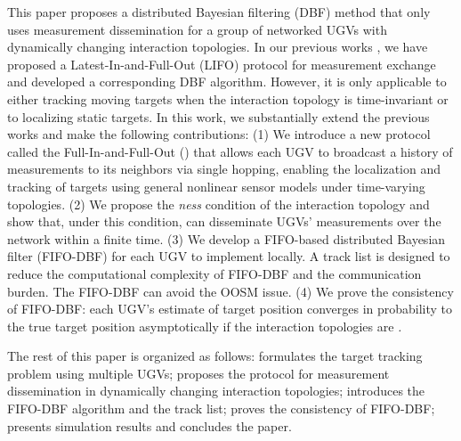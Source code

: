 	\textcolor{\revcol}{
	This paper proposes a distributed Bayesian filtering (DBF) method that only uses measurement dissemination for a group of networked UGVs with dynamically changing interaction topologies. 
	In our previous works \cite{liu2017measurement,liu2016distributed,liu2017distributed}, we have proposed a Latest-In-and-Full-Out (LIFO) protocol for measurement exchange and developed a corresponding DBF algorithm.
	However, it is only applicable to either tracking moving targets when the interaction topology is time-invariant or to localizing static targets.
	In this work, we substantially extend the previous works and make the following contributions:
	(1) We introduce a new protocol called the Full-In-and-Full-Out (\proto) that allows each UGV to broadcast a history of measurements to its neighbors via single hopping, enabling the localization and tracking of targets using general nonlinear sensor models under time-varying topologies. 
	(2) We propose the 
	\textit{{\fc ness}} condition of the interaction topology and show that, under this condition, {\proto} can disseminate UGVs' measurements over the network within a finite time.
	(3) We develop a FIFO-based distributed Bayesian filter (FIFO-DBF) for each UGV to implement locally.
	A track list is designed to reduce the computational complexity of FIFO-DBF and the communication burden. 
	The FIFO-DBF can avoid the OOSM issue.
	(4) We prove the consistency of FIFO-DBF: each UGV's estimate of target position converges in probability to the true target position asymptotically if the interaction topologies are \textit{\fc.}}
	
	
	The rest of this paper is organized as follows: 
	 formulates the target tracking problem using multiple UGVs;
	 proposes the {\proto} protocol for measurement dissemination in dynamically changing interaction topologies;
	 introduces the FIFO-DBF algorithm and the track list;
	 proves the consistency of FIFO-DBF;
	 presents simulation results and  concludes the paper.